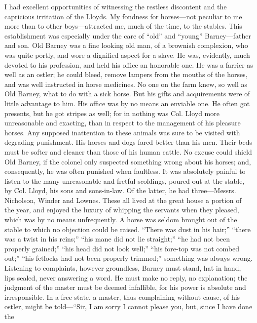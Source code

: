 I had excellent opportunities of witnessing the restless discontent and
the capricious irritation of the Lloyds. My fondness for horses---not
peculiar to me more than to other boys---attracted me, much of the time,
to the stables. This establishment was especially under the care of
``old'' and ``young'' Barney---father and son. Old Barney was a fine
looking old man, of a brownish complexion, who was quite portly, and
wore a dignified aspect for a slave. He was, evidently, much devoted to
his profession, and held his office an honorable one. He was a farrier
as well as an ostler; he could bleed, remove lampers from the mouths of
the horses, and was well instructed in horse medicines. No one on the
farm knew, so well as Old Barney, what to do with a sick horse. But his
gifts and acquirements were of little advantage to him. His office was
by no means an enviable one. He often got presents, but he got stripes
as well; for in nothing was Col. Lloyd more unreasonable and exacting,
than in respect to the management of his pleasure horses. Any supposed
inattention to these animals was sure to be visited with degrading
punishment. His horses and dogs fared better than his men. Their beds
must be softer and cleaner than those of his human cattle. No excuse
could shield {\protect\hypertarget{113}{}{}}Old Barney, if the colonel
only suspected something wrong about his horses; and, consequently, he
was often punished when faultless. It was absolutely painful to listen
to the many unreasonable and fretful scoldings, poured out at the
stable, by Col. Lloyd, his sons and sons-in-law. Of the latter, he had
three---Messrs. Nicholson, Winder and Lownes. These all lived at the
great house a portion of the year, and enjoyed the luxury of whipping
the servants when they pleased, which was by no means unfrequently. A
horse was seldom brought out of the stable to which no objection could
be raised. ``There was dust in his hair;'' ``there was a twist in his
reins;'' ``his mane did not lie straight;'' ``he had not been properly
grained;'' ``his head did not look well;'' ``his fore-top was not combed
out;'' ``his fetlocks had not been properly trimmed;'' something was
always wrong. Listening to complaints, however groundless, Barney must
stand, hat in hand, lips sealed, never answering a word. He must make no
reply, no explanation; the judgment of the master must be deemed
infallible, for his power is absolute and irresponsible. In a free
state, a master, thus complaining without cause, of his ostler, might be
told---``Sir, I am sorry I cannot please you, but, since I have done the
